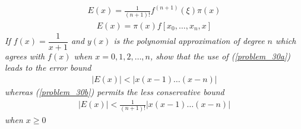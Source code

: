 \documentclass[12pt]{article}
\begin{document}
\begin{align}
\label{problem_30a}
E(x) = \frac{1}{(n+1)!}f^{(n+1)}(\xi)\pi(x)
\end{align}
\begin{align}
\label{problem_30b}
E(x) = \pi(x)f[x_0,\dots, x_n, x]
\end{align}
{\it If $f(x) = \dfrac{1}{x+1}$ and $y(x)$ is the polynomial approximation of degree $n$ which agrees with $f(x)$ when $x = 0, 1, 2, \dots, n$, show that the use of (\ref{problem_30a}) leads to the error bound}
\begin{align*}
|E(x)| < |x(x-1)\dots(x-n)|
\end{align*}
{\it whereas (\ref{problem_30b}) permits the less conservative bound}
\begin{align*}
|E(x)| < \frac{1}{(n+1)!}|x(x-1)\dots(x-n)|
\end{align*}
{\it when $x \geq 0$} \\
\end{document}
